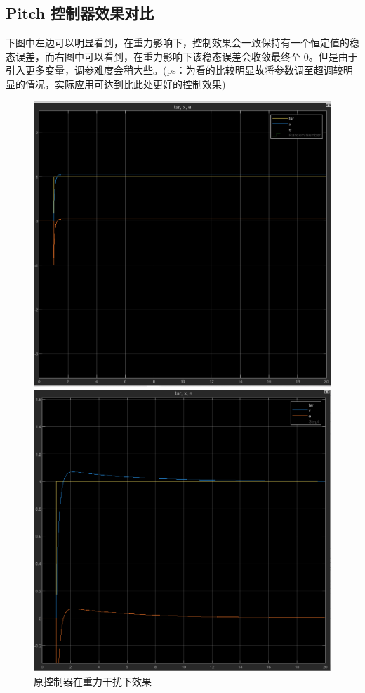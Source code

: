\documentclass[12pt]{article}
\begin{document}
    \subsection{Pitch 控制器效果对比}
    下图中左边可以明显看到，在重力影响下，控制效果会一致保持有一个恒定值的稳态误差，而右图中可以看到，在重力影响下该稳态误差会收敛最终至 0。但是由于引入更多变量，调参难度会稍大些。(ps：为看的比较明显故将参数调至超调较明显的情况，实际应用可达到比此处更好的控制效果)
    \begin{figure}[htbp]
        \centering
        \begin{minipage}[t]{0.48\textwidth}
            \centering
            \includegraphics[width=\textwidth]{../other/Yaw_13.png}
            \caption{原控制器在重力干扰下效果}
            \end{minipage}
            \hfill
            \begin{minipage}[t]{0.48\textwidth}
            \centering
            \includegraphics[width=\textwidth]{../other/Pitch_1}

\end{minipage}
\end{figure}
\end{document}
